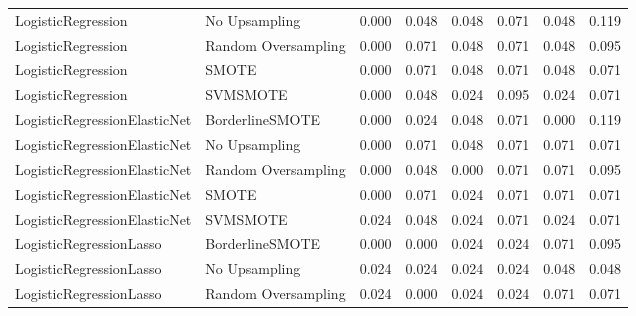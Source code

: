 \begin{tabular}{llllllll}
          LogisticRegression &       No Upsampling & 0.000 &                     0.048 &                 0.048 &                  0.071 &                                   0.048 &     0.119 \\
          LogisticRegression & Random Oversampling & 0.000 &                     0.071 &                 0.048 &                  0.071 &                                   0.048 &     0.095 \\
          LogisticRegression &               SMOTE & 0.000 &                     0.071 &                 0.048 &                  0.071 &                                   0.048 &     0.071 \\
          LogisticRegression &            SVMSMOTE & 0.000 &                     0.048 &                 0.024 &                  0.095 &                                   0.024 &     0.071 \\
LogisticRegressionElasticNet &     BorderlineSMOTE & 0.000 &                     0.024 &                 0.048 &                  0.071 &                                   0.000 &     0.119 \\
LogisticRegressionElasticNet &       No Upsampling & 0.000 &                     0.071 &                 0.048 &                  0.071 &                                   0.071 &     0.071 \\
LogisticRegressionElasticNet & Random Oversampling & 0.000 &                     0.048 &                 0.000 &                  0.071 &                                   0.071 &     0.095 \\
LogisticRegressionElasticNet &               SMOTE & 0.000 &                     0.071 &                 0.024 &                  0.071 &                                   0.071 &     0.071 \\
LogisticRegressionElasticNet &            SVMSMOTE & 0.024 &                     0.048 &                 0.024 &                  0.071 &                                   0.024 &     0.071 \\
     LogisticRegressionLasso &     BorderlineSMOTE & 0.000 &                     0.000 &                 0.024 &                  0.024 &                                   0.071 &     0.095 \\
     LogisticRegressionLasso &       No Upsampling & 0.024 &                     0.024 &                 0.024 &                  0.024 &                                   0.048 &     0.048 \\
     LogisticRegressionLasso & Random Oversampling & 0.024 &                     0.000 &                 0.024 &                  0.024 &                                   0.071 &     0.071 \\

\end{tabular}
